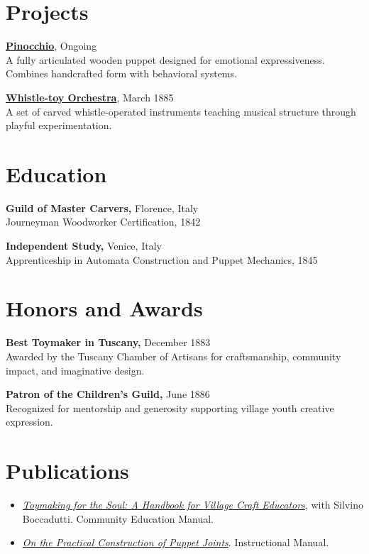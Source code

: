 \documentclass[10pt]{article}
\begin{document}
\section*{Projects}

\textbf{\href{https://en.wikipedia.org/wiki/Pinocchio}{Pinocchio}}, \hfill Ongoing \\
A fully articulated wooden puppet designed for emotional expressiveness. Combines handcrafted form with behavioral systems. \\
\vspace{0.3em}

\textbf{\href{}{Whistle-toy Orchestra}}, \hfill March 1885 \\
A set of carved whistle-operated instruments teaching musical structure through playful experimentation. \\
\vspace{0.3em}


\section*{Education}

\textbf{Guild of Master Carvers, } \hfill Florence, Italy \\
Journeyman Woodworker Certification, \hfill 1842
\vspace{0.3em}

\textbf{Independent Study, } \hfill Venice, Italy \\
Apprenticeship in Automata Construction and Puppet Mechanics, \hfill 1845
\vspace{0.3em}


\section*{Honors and Awards}

\textbf{Best Toymaker in Tuscany,} \hfill December 1883 \\
Awarded by the Tuscany Chamber of Artisans for craftsmanship, community impact, and imaginative design.
\vspace{0.3em}

\textbf{Patron of the Children's Guild,} \hfill June 1886 \\
Recognized for mentorship and generosity supporting village youth creative expression.
\vspace{0.3em}


\section*{Publications}
\begin{itemize}[leftmargin=*, noitemsep, topsep=0.1em]

    \item \textit{\href{}{Toymaking for the Soul: A Handbook for Village Craft Educators}}, with Silvino Boccadutti. Community Education Manual.

    \item \textit{\href{}{On the Practical Construction of Puppet Joints}}. Instructional Manual.

\end{itemize}
\end{document}
